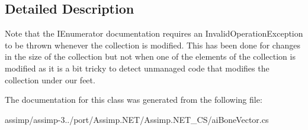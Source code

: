 \subsection{Detailed Description}
Note that the I\+Enumerator documentation requires an Invalid\+Operation\+Exception to be thrown whenever the collection is modified. This has been done for changes in the size of the collection but not when one of the elements of the collection is modified as it is a bit tricky to detect unmanaged code that modifies the collection under our feet. 

The documentation for this class was generated from the following file\+:\begin{DoxyCompactItemize}
\item 
assimp/assimp-\/3../port/\+Assimp.\+N\+E\+T/\+Assimp.\+N\+E\+T\+\_\+\+C\+S/ai\+Bone\+Vector.\+cs\end{DoxyCompactItemize}
